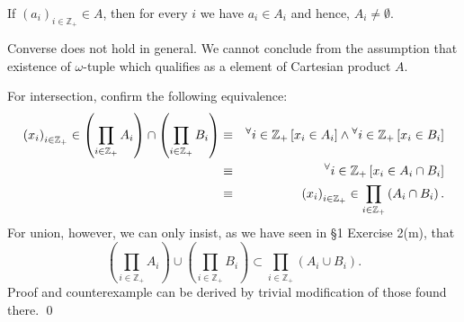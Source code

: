 \documentclass[a4paper,12pt]{article}
\begin{document}
\begin{sol}
	If \( (a_i)_{i \in \mathbb{Z}_{+}} \in A  \),
	then for every \( i \) we have
	\( a_i \in A_i \)
	and hence, \( A_i \neq \emptyset \).
	
	Converse does not hold in general.
	We cannot conclude from the assumption that existence of \( \omega \)-tuple which qualifies as a element of Cartesian product \( A \).
	
	For intersection,
	confirm the following equivalence:
	\begin{eqnarray*}
		\left( x_i \right)_{i \in \mathbb{Z}_{+}}
		\in \left( \prod_{i \in \mathbb{Z}_{+}} A_i \right)
		\cap
		\left( \prod_{i \in \mathbb{Z}_{+}} B_i \right)
		&\equiv&
		{}^{\forall}  i \in \mathbb{Z}_{+}\left[ x_i \in A_i \right]
		\wedge
		{}^{\forall}  i \in \mathbb{Z}_{+}\left[ x_i \in B_i \right]\\
		&\equiv&
		{}^{\forall}  i \in \mathbb{Z}_{+}\left[ x_i \in A_i \cap B_i \right]\\
		&\equiv&
		\left( x_i \right)_{i \in \mathbb{Z}_{+}} \in
		\prod_{i \in \mathbb{Z}_{+}} \left( A_i \cap B_i \right).
	\end{eqnarray*}
	For union, however, we can only insist, as we have seen in \S1 Exercise 2(m), that
	\begin{equation*}
		\left( \prod_{i \in \mathbb{Z}_{+}} A_i \right)
		\cup
		\left( \prod_{i \in \mathbb{Z}_{+}} B_i \right)
		\subset
		\prod_{i \in \mathbb{Z}_{+}} \left( A_i \cup B_i \right).
	\end{equation*}
	Proof and counterexample can be derived by trivial modification of those found there.
	\qed\end{sol}
\end{document}

